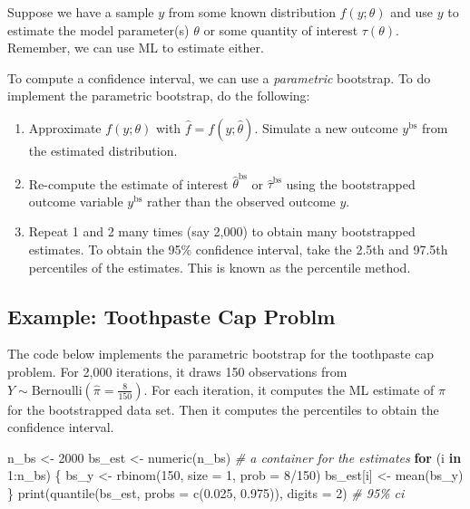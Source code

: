 \documentclass[
]{book}
\newenvironment{Shaded}{\begin{snugshade}}{\end{snugshade}}
\newcommand{\AttributeTok}[1]{\textcolor[rgb]{0.77,0.63,0.00}{#1}}
\newcommand{\CommentTok}[1]{\textcolor[rgb]{0.56,0.35,0.01}{\textit{#1}}}
\newcommand{\ControlFlowTok}[1]{\textcolor[rgb]{0.13,0.29,0.53}{\textbf{#1}}}
\newcommand{\DecValTok}[1]{\textcolor[rgb]{0.00,0.00,0.81}{#1}}
\newcommand{\FloatTok}[1]{\textcolor[rgb]{0.00,0.00,0.81}{#1}}
\newcommand{\FunctionTok}[1]{\textcolor[rgb]{0.00,0.00,0.00}{#1}}
\newcommand{\NormalTok}[1]{#1}
\newcommand{\OtherTok}[1]{\textcolor[rgb]{0.56,0.35,0.01}{#1}}
\newcommand{\SpecialCharTok}[1]{\textcolor[rgb]{0.00,0.00,0.00}{#1}}
\providecommand{\tightlist}{%
  \setlength{\itemsep}{0pt}\setlength{\parskip}{0pt}}
\begin{document}
Suppose we have a sample \(y\) from some known distribution
\(f(y; \theta)\) and use \(y\) to estimate the model parameter(s)
\(\theta\) or some quantity of interest \(\tau(\theta)\). Remember, we
can use ML to estimate either.

To compute a confidence interval, we can use a \emph{parametric}
bootstrap. To do implement the parametric bootstrap, do the following:

\begin{enumerate}
\def\labelenumi{\arabic{enumi}.}
\tightlist
\item
  Approximate \(f(y; \theta)\) with \(\hat{f} = f(y; \hat{\theta})\).
  Simulate a new outcome \(y^{\text{bs}}\) from the estimated
  distribution.
\item
  Re-compute the estimate of interest \(\hat{\theta}^{\text{bs}}\) or
  \(\hat{\tau}^{\text{bs}}\) using the bootstrapped outcome variable
  \(y^{\text{bs}}\) rather than the observed outcome \(y\).
\item
  Repeat 1 and 2 many times (say 2,000) to obtain many bootstrapped
  estimates. To obtain the 95\% confidence interval, take the 2.5th and
  97.5th percentiles of the estimates. This is known as the percentile
  method.
\end{enumerate}

\hypertarget{example-toothpaste-cap-problm}{%
\subsection{Example: Toothpaste Cap
Problm}\label{example-toothpaste-cap-problm}}

The code below implements the parametric bootstrap for the toothpaste
cap problem. For 2,000 iterations, it draws 150 observations from
\(Y \sim \text{Bernoulli}(\hat{\pi} = \frac{8}{150})\). For each
iteration, it computes the ML estimate of \(\pi\) for the bootstrapped
data set. Then it computes the percentiles to obtain the confidence
interval.

\begin{Shaded}
\begin{Highlighting}[]
\NormalTok{n\_bs }\OtherTok{\textless{}{-}} \DecValTok{2000}
\NormalTok{bs\_est }\OtherTok{\textless{}{-}} \FunctionTok{numeric}\NormalTok{(n\_bs)  }\CommentTok{\# a container for the estimates}
\ControlFlowTok{for}\NormalTok{ (i }\ControlFlowTok{in} \DecValTok{1}\SpecialCharTok{:}\NormalTok{n\_bs) \{}
\NormalTok{  bs\_y }\OtherTok{\textless{}{-}} \FunctionTok{rbinom}\NormalTok{(}\DecValTok{150}\NormalTok{, }\AttributeTok{size =} \DecValTok{1}\NormalTok{, }\AttributeTok{prob =} \DecValTok{8}\SpecialCharTok{/}\DecValTok{150}\NormalTok{)}
\NormalTok{  bs\_est[i] }\OtherTok{\textless{}{-}} \FunctionTok{mean}\NormalTok{(bs\_y)}
\NormalTok{\}}
\FunctionTok{print}\NormalTok{(}\FunctionTok{quantile}\NormalTok{(bs\_est, }\AttributeTok{probs =} \FunctionTok{c}\NormalTok{(}\FloatTok{0.025}\NormalTok{, }\FloatTok{0.975}\NormalTok{)), }\AttributeTok{digits =} \DecValTok{2}\NormalTok{)  }\CommentTok{\# 95\% ci}
\end{Highlighting}
\end{Shaded}
\end{document}
